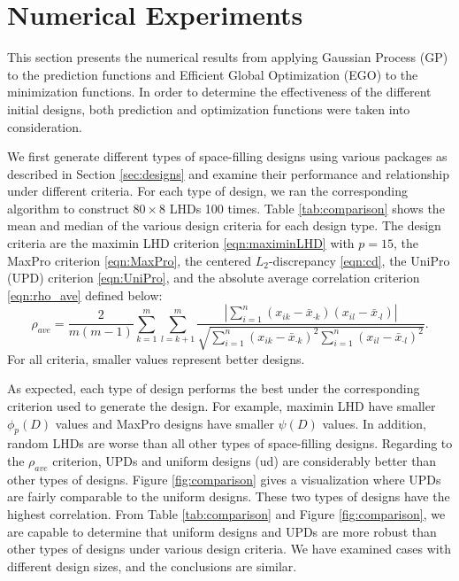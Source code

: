 \documentclass [PhD] {package/uclathes}
\begin{document}
\clearpage
\section{Numerical Experiments}\label{numerical-experiments}
This section presents the numerical results from applying Gaussian Process (GP) to the prediction functions and Efficient Global Optimization (EGO) to the minimization functions. In order to determine the effectiveness of the different initial designs, both prediction and optimization functions were taken into consideration.

We first generate different types of space-filling designs using various packages as described in Section \ref{sec:designs} and examine their performance and relationship under different criteria. For each type of design, we ran the corresponding algorithm to construct $80\times 8$ LHDs 100 times. Table \ref{tab:comparison} shows the mean and median of the various design criteria for each design type.
The design criteria are the maximin LHD criterion \eqref{eqn:maximinLHD} with $p=15$, the MaxPro criterion \eqref{eqn:MaxPro}, the centered $L_2$-discrepancy \eqref{eqn:cd}, the UniPro (UPD) criterion \eqref{eqn:UniPro}, and the absolute average correlation criterion \eqref{eqn:rho_ave}  defined below:
\begin{equation}\label{eqn:rho_ave}
\rho_{ave} =\frac{2}{m(m-1)}\sum_{k = 1}^m\sum_{l = k+1}^m\frac{\left|\sum_{i=1}^n\left(x_{ik}-\bar{x}_{\cdot k}\right)\left(x_{il}-\bar{x}_{\cdot l}\right)\right|}{\sqrt{\sum_{i=1}^n\left(x_{ik}-\bar{x}_{\cdot k}\right)^2 \sum_{i=1}^n\left(x_{il} -\bar{x}_{\cdot l}\right)^2}}.
\end{equation}
For all criteria, smaller values represent better designs.

As expected, each type of design performs the best under the corresponding criterion used to generate the design. For example, maximin LHD have smaller $\phi_p(D)$ values and MaxPro designs have smaller $\psi(D)$ values. In addition, random LHDs are worse than all other types of space-filling designs.
Regarding to the $\rho_{ave}$ criterion, UPDs and uniform designs (ud) are considerably better than other types of designs.
 Figure \ref{fig:comparison} gives a visualization where UPDs are fairly comparable to the uniform designs. These two types of designs have the highest correlation. From Table \ref{tab:comparison} and Figure \ref{fig:comparison}, we are capable to determine that uniform designs and UPDs are more robust than other types of designs under various design criteria. We have examined cases with different design sizes, and the conclusions are similar.
\end{document}
